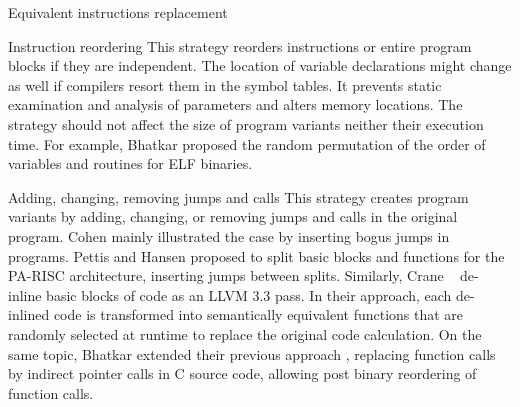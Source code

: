 \begin{strategy}{Equivalent instructions replacement}
\end{strategy}


\begin{strategy}{Instruction reordering}
    \label{strategy:S2}
    \normalfont
    This strategy reorders instructions or entire program blocks if they are independent.
    The location of variable declarations might change as well if compilers resort them in the symbol tables. It prevents static examination and analysis of parameters and alters memory locations. The strategy should not affect the size of program variants neither their execution time. For example, Bhatkar \etal \cite{bhatkar03, bhatkar2005efficient} proposed the random permutation of the order of variables and routines for ELF binaries.
\end{strategy}

\begin{strategy}{Adding, changing, removing jumps and calls}
    \label{strategy:S3}
    \normalfont
    This strategy creates program variants by adding, changing, or removing jumps and calls in the original program. Cohen \cite{cohen1993operating} mainly illustrated the case by inserting bogus jumps in programs. Pettis and Hansen \cite{pettisochhansen} proposed to split basic blocks and functions for the PA-RISC architecture, inserting jumps between splits.
    Similarly, Crane \etal~\cite{crane2015thwarting} de-inline basic blocks of code as an LLVM 3.3 pass. In their approach, each de-inlined code is transformed into semantically equivalent functions that are randomly selected at runtime to replace the original code calculation. On the same topic, Bhatkar \etal \cite{bhatkar2005efficient} extended their previous approach \cite{bhatkar03}, replacing function calls by indirect pointer calls in C source code, allowing post binary reordering of function calls.
\end{strategy}



